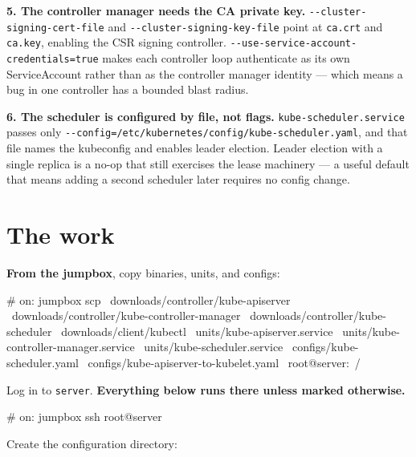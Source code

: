 \documentclass[11pt,oneside]{report}
\begin{document}
\textbf{5. The
controller manager
needs the CA private
key.}
\texttt{-\/-cluster-}\allowbreak{}\texttt{signing-}\allowbreak{}\texttt{cert-}\allowbreak{}\texttt{file}
and
\texttt{-\/-cluster-}\allowbreak{}\texttt{signing-}\allowbreak{}\texttt{key-}\allowbreak{}\texttt{file}
point at
\texttt{ca.crt} and
\texttt{ca.key},
enabling the CSR
signing controller.
\texttt{-\/-use-}\allowbreak{}\texttt{service-}\allowbreak{}\texttt{account-}\allowbreak{}\texttt{credentials=true}
makes each
controller loop
authenticate as its
own ServiceAccount
rather than as the
controller manager
identity --- which
means a bug in one
controller has a
bounded blast
radius.

\textbf{6. The
scheduler is
configured by file,
not flags.}
\texttt{kube-}\allowbreak{}\texttt{scheduler.}\allowbreak{}\texttt{service}
passes only
\texttt{-\/-config=/}\allowbreak{}\texttt{etc/}\allowbreak{}\texttt{kubernetes/}\allowbreak{}\texttt{config/}\allowbreak{}\texttt{kube-}\allowbreak{}\texttt{scheduler.}\allowbreak{}\texttt{yaml},
and that file names
the kubeconfig and
enables leader
election. Leader
election with a
single replica is a
no-op that still
exercises the lease
machinery --- a
useful default that
means adding a
second scheduler
later requires no
config change.

\hypertarget{the-work-7}{%
\section{The
work}\label{the-work-7}}

\textbf{From the
jumpbox}, copy
binaries, units, and
configs:

\begin{cmdlst}
# on: jumpbox
scp \
  downloads/controller/kube-apiserver \
  downloads/controller/kube-controller-manager \
  downloads/controller/kube-scheduler \
  downloads/client/kubectl \
  units/kube-apiserver.service \
  units/kube-controller-manager.service \
  units/kube-scheduler.service \
  configs/kube-scheduler.yaml \
  configs/kube-apiserver-to-kubelet.yaml \
  root@server:~/
\end{cmdlst}

Log in to
\texttt{server}.
\textbf{Everything
below runs there
unless marked
otherwise.}

\begin{cmdlst}
# on: jumpbox
ssh root@server
\end{cmdlst}

Create the
configuration
directory:
\end{document}

